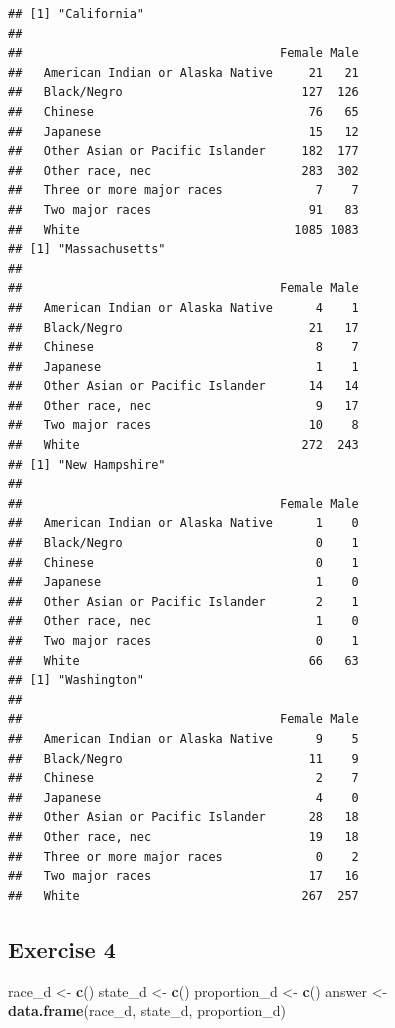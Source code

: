 \documentclass[]{book}
\newenvironment{Shaded}{\begin{snugshade}}{\end{snugshade}}
\newcommand{\KeywordTok}[1]{\textcolor[rgb]{0.13,0.29,0.53}{\textbf{#1}}}
\newcommand{\StringTok}[1]{\textcolor[rgb]{0.31,0.60,0.02}{#1}}
\newcommand{\NormalTok}[1]{#1}
\theoremstyle{definition}
\theoremstyle{definition}
\theoremstyle{definition}
\theoremstyle{remark}
\begin{document}
\begin{verbatim}
## [1] "California"
##                                   
##                                    Female Male
##   American Indian or Alaska Native     21   21
##   Black/Negro                         127  126
##   Chinese                              76   65
##   Japanese                             15   12
##   Other Asian or Pacific Islander     182  177
##   Other race, nec                     283  302
##   Three or more major races             7    7
##   Two major races                      91   83
##   White                              1085 1083
## [1] "Massachusetts"
##                                   
##                                    Female Male
##   American Indian or Alaska Native      4    1
##   Black/Negro                          21   17
##   Chinese                               8    7
##   Japanese                              1    1
##   Other Asian or Pacific Islander      14   14
##   Other race, nec                       9   17
##   Two major races                      10    8
##   White                               272  243
## [1] "New Hampshire"
##                                   
##                                    Female Male
##   American Indian or Alaska Native      1    0
##   Black/Negro                           0    1
##   Chinese                               0    1
##   Japanese                              1    0
##   Other Asian or Pacific Islander       2    1
##   Other race, nec                       1    0
##   Two major races                       0    1
##   White                                66   63
## [1] "Washington"
##                                   
##                                    Female Male
##   American Indian or Alaska Native      9    5
##   Black/Negro                          11    9
##   Chinese                               2    7
##   Japanese                              4    0
##   Other Asian or Pacific Islander      28   18
##   Other race, nec                      19   18
##   Three or more major races             0    2
##   Two major races                      17   16
##   White                               267  257
\end{verbatim}

\subsection*{Exercise 4}\label{exercise-4}

\begin{Shaded}
\begin{Highlighting}[]
\NormalTok{race_d <-}\StringTok{ }\KeywordTok{c}\NormalTok{()}
\NormalTok{state_d <-}\StringTok{ }\KeywordTok{c}\NormalTok{()}
\NormalTok{proportion_d <-}\StringTok{ }\KeywordTok{c}\NormalTok{()}
\NormalTok{answer <-}\StringTok{ }\KeywordTok{data.frame}\NormalTok{(race_d, state_d, proportion_d)}
\end{Highlighting}
\end{Shaded}
\end{document}

